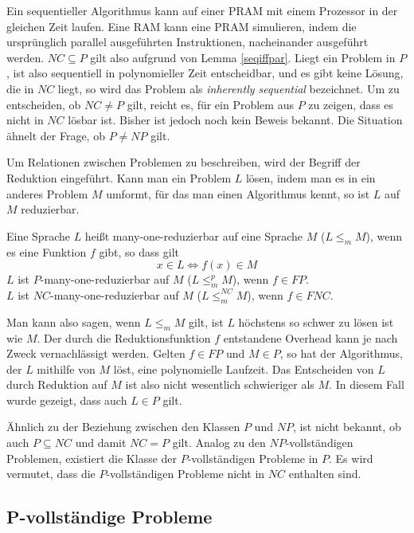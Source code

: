 %
Ein sequentieller Algorithmus kann auf einer PRAM mit einem Prozessor in der
gleichen Zeit laufen.
Eine RAM kann eine PRAM simulieren, indem die ursprünglich parallel
ausgeführten Instruktionen, nacheinander ausgeführt werden.
$NC \subseteq P$ gilt also aufgrund von Lemma \ref{seqiffpar}.
%
Liegt ein Problem in $P$, ist also sequentiell in polynomieller Zeit
entscheidbar, und es gibt keine Lösung, die in $NC$ liegt, so wird das
Problem als \emph{inherently sequential} bezeichnet.
Um zu entscheiden, ob $NC \neq P$ gilt, reicht es, für ein Problem aus $P$ zu
zeigen, dass es nicht in $NC$ lösbar ist.
Bisher ist jedoch noch kein Beweis bekannt.
Die Situation ähnelt der Frage, ob $P \neq NP$ gilt.

Um Relationen zwischen Problemen zu beschreiben, wird der Begriff der
Reduktion eingeführt.
Kann man ein Problem $L$ lösen, indem man es in ein anderes Problem $M$ umformt,
für das man einen Algorithmus kennt, so ist $L$ auf $M$ reduzierbar.
%
\begin{define}
    Eine Sprache $L$ heißt many-one-reduzierbar auf eine Sprache $M$
    ($L \leq_m M$), wenn es eine Funktion $f$ gibt, so dass gilt
    \begin{equation}
        x \in L \Leftrightarrow f(x) \in M
    \end{equation}
    $L$ ist $P$-many-one-reduzierbar auf $M$ ($L \leq_m^p M$), wenn $f \in FP$. \\
    $L$ ist $NC$-many-one-reduzierbar auf $M$ ($L \leq_m^{NC} M$), wenn $f \in FNC$.
    \cite[S.47]{greenlaw}
\end{define}
%
Man kann also sagen, wenn $L \leq_m M$ gilt, ist $L$ höchstens so schwer zu
lösen ist wie $M$.
Der durch die Reduktionsfunktion $f$ entstandene Overhead kann je nach Zweck
vernachlässigt werden.
Gelten $f \in FP$ und $M \in P$, so hat der Algorithmus, der $L$ mithilfe von
$M$ löst, eine polynomielle Laufzeit.
Das Entscheiden von $L$ durch Reduktion auf $M$ ist also nicht wesentlich
schwieriger als $M$.
In diesem Fall wurde gezeigt, dass auch $L \in P$ gilt.

Ähnlich zu der Beziehung zwischen den Klassen $P$ und $NP$, ist nicht bekannt,
ob auch $P \subseteq NC$ und damit $NC = P$ gilt.
Analog zu den $NP$-vollständigen Problemen, existiert die Klasse der $P$-vollständigen Probleme in $P$.
Es wird vermutet, dass die $P$-vollständigen Probleme nicht in $NC$ enthalten sind.
\cite[S.54ff]{greenlaw}\cite[S.535]{jaja}

\subsection{P-vollständige Probleme}
